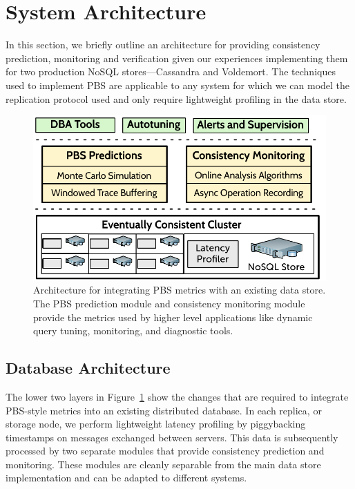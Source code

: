 \section{System Architecture}
\label{sec:architecture}

In this section, we briefly outline an architecture for providing
consistency prediction, monitoring and verification given our experiences
implementing them for two production NoSQL stores---Cassandra and
Voldemort. The techniques used to implement PBS are applicable to any
system for which we can model the replication protocol used and only
require lightweight profiling in the data store.


\begin{figure}
\centering
\includegraphics[width=\columnwidth]{figs/cluster-arch.pdf}
\caption{Architecture for integrating PBS metrics with an existing data
  store. The PBS prediction module and consistency monitoring module
  provide the metrics used by higher level applications like dynamic
  query tuning, monitoring, and diagnostic tools.}
\label{fig:pbs-sys-arch}
\end{figure}


\subsection{Database Architecture}
\label{sec:dbarch}

The lower two layers in Figure~\ref{fig:pbs-sys-arch} show the changes
that are required to integrate PBS-style metrics into an existing
distributed database. In each replica, or storage node, we perform
lightweight latency profiling by piggybacking timestamps on messages
exchanged between servers. This data is subsequently processed by two
separate modules that provide consistency prediction and monitoring.
These modules are cleanly separable from the main data store
implementation and can be adapted to different systems.

